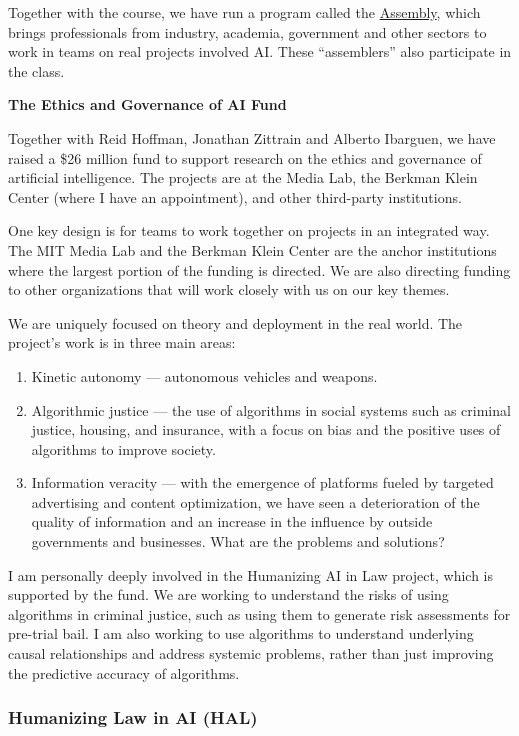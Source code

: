 Together with the course, we have run a program called the \href{https://cyber.harvard.edu/research/assembly}{Assembly}, which brings professionals from industry, academia, government and other sectors to work in teams on  real projects involved \ac{AI}. These ``assemblers'' also participate in the class.

\textbf{The Ethics and Governance of \ac{AI} Fund}

Together with Reid Hoffman, Jonathan Zittrain and Alberto Ibarguen, we have raised a \$26 million fund to support research on the ethics and governance of artificial intelligence. The projects are at the Media Lab, the Berkman Klein Center (where I  have an appointment), and other third-party institutions.

One key design is for teams to work together on projects in an integrated way. The MIT Media Lab and the Berkman Klein Center are the anchor institutions where the largest portion of the funding is directed. We are also directing funding to other organizations that will work closely with us on our key themes. 

We are  uniquely focused on theory and deployment in the real world. The project's work is in three main areas:

\begin{enumerate}
\item Kinetic autonomy --- autonomous vehicles and weapons.
\item Algorithmic justice --- the use of algorithms in social systems such as criminal justice, housing, and insurance, with a focus on bias and the  positive uses of algorithms to improve society.
\item Information veracity --- with the emergence of platforms fueled by targeted advertising and content optimization, we have seen a deterioration of the quality of information and an increase in the influence by outside governments and businesses. What are the problems and solutions?
\end{enumerate}

I am personally deeply involved in the Humanizing \ac{AI} in Law project, which is supported by the fund. We are working to understand the risks of using algorithms in criminal justice, such as using them to generate risk assessments for pre-trial bail. I am also working to use algorithms to understand underlying causal relationships and address systemic problems, rather than just improving the predictive accuracy of algorithms.

\subsubsection{Humanizing Law in \ac{AI} (HAL)}
\label{sec:HAL}

